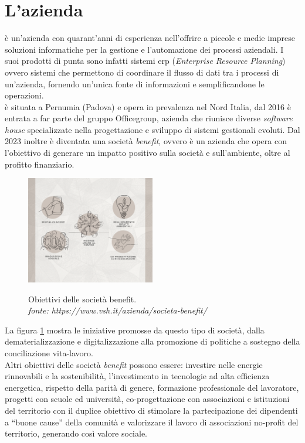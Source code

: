 \section{L'azienda}
{\company} è un'azienda con quarant'anni di esperienza nell'offrire a piccole e medie imprese soluzioni informatiche per la 
gestione e l'automazione dei processi aziendali. I suoi prodotti di punta sono infatti sistemi \gls{erp} (\textit{Enterprise 
Resource Planning}) ovvero sistemi che permettono di coordinare il flusso di dati tra i processi di un'azienda, fornendo un'unica fonte di 
informazioni e semplificandone le operazioni.\\
{\company} è situata a Pernumia (Padova) e opera in prevalenza nel Nord Italia, dal 2016 è entrata a far parte del gruppo Officegroup, azienda 
che riunisce diverse \textit{software house} specializzate nella progettazione e sviluppo di sistemi gestionali evoluti. 
Dal 2023 inoltre è diventata una società \textit{benefit}, ovvero è un azienda che opera con l'obiettivo di generare un impatto positivo 
sulla società e sull'ambiente, oltre al profitto finanziario.

\begin{figure}[H]
    \centering
    \includegraphics[alt={Obiettivi delle società benefit}, width=0.5\textwidth]{img/soc-benefit.png}
    \caption[Obiettivi delle società benefit.]{Obiettivi delle società benefit. \\ \textit{fonte: https://www.vsh.it/azienda/societa-benefit/}}
    \label{fig:società benefit}
\end{figure}

La figura \ref{fig:società benefit} mostra le iniziative promosse da questo tipo di società, dalla dematerializzazione 
e digitalizzazione alla promozione di politiche a sostegno della conciliazione vita-lavoro.\\
Altri obiettivi delle società \textit{benefit} possono essere: investire nelle energie rinnovabili e la sostenibilità, l'investimento in tecnologie 
ad alta efficienza energetica, rispetto della parità di genere, formazione professionale del lavoratore, progetti con scuole ed 
università, co-progettazione con associazioni e istituzioni del territorio con il duplice obiettivo di stimolare la partecipazione dei dipendenti 
a “buone cause” della comunità e valorizzare il lavoro di associazioni no-profit del territorio, generando così valore sociale.

